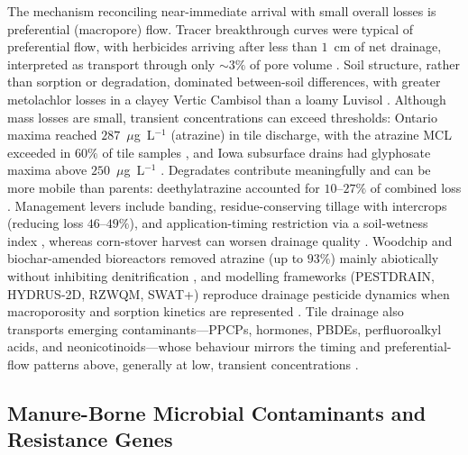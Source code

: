 The mechanism reconciling near-immediate arrival with small overall losses is
preferential (macropore) flow. Tracer breakthrough curves were typical of
preferential flow, with herbicides arriving after less than $1$~cm of net
drainage, interpreted as transport through only $\sim3\%$ of pore volume
\parencite{Fortin2002,Dousset2004}. Soil structure, rather than sorption or
degradation, dominated between-soil differences, with greater metolachlor losses
in a clayey Vertic Cambisol than a loamy Luvisol \parencite{Novak2001,Novak2003}.
Although mass losses are small, transient concentrations can exceed thresholds:
Ontario maxima reached $287$~$\mu$g~L$^{-1}$ (atrazine) in tile discharge, with
the atrazine MCL exceeded in $60\%$ of tile samples \parencite{GAYNOR1995}, and
Iowa subsurface drains had glyphosate maxima above $250$~$\mu$g~L$^{-1}$
\parencite{Coupe2012}. Degradates contribute meaningfully and can be more mobile
than parents: deethylatrazine accounted for $10$--$27\%$ of combined loss
\parencite{GAYNOR1995,MUIR1978,JAYACHANDRAN1994}. Management levers include
banding, residue-conserving tillage with intercrops (reducing loss
$46$--$49\%$), and application-timing restriction via a soil-wetness index
\parencite{Gaynor2001,Julien2023,Moorman1999}, whereas corn-stover harvest can
worsen drainage quality \parencite{Shipitalo2016}. Woodchip and biochar-amended
bioreactors removed atrazine (up to $93\%$) mainly abiotically without inhibiting
denitrification \parencite{Hassanpour2019,Ilhan2011}, and modelling frameworks
(PESTDRAIN, HYDRUS-2D, RZWQM, SWAT+) reproduce drainage pesticide dynamics when
macroporosity and sorption kinetics are represented
\parencite{Branger2009,Boivin2006,Wendell2024,Novak2003}. Tile drainage also
transports emerging contaminants---PPCPs, hormones, PBDEs, perfluoroalkyl acids,
and neonicotinoids---whose behaviour mirrors the timing and preferential-flow
patterns above, generally at low, transient concentrations
\parencite{Gottschall2012,Gottschall2013,Gottschall2017,Ghirardini2019,Schaafsma2019}.

\subsection{Manure-Borne Microbial Contaminants and Resistance Genes}

